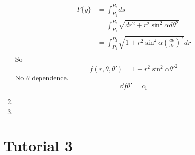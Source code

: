 \documentclass{X:/Documents/Coding/Latex/myassignment}
\begin{document}
\begin{enumerate}
	\begin{align*}
		F\{y\} &= \int_{P_1}^{P_2} ds\\
		&= \int_{P_1}^{P_2} \sqrt{dr^2 + r^2 \sin^2\alpha d\theta^2}\\
		&= \int_{P_1}^{P_2} \sqrt{1 + r^2 \sin^2\alpha \left(\frac{d\theta}{dr}\right)^{2}} dr\\
	\end{align*}
	So
	\[f(r,\theta,\theta') = 1 + r^2 \sin^2 \alpha \theta'^2\]
	No $\theta$ dependence.
	\[\dd f{\theta'} =  c_1\]
	\item 
	\item 
\end{enumerate}

\section{Tutorial 3}
\end{document}
